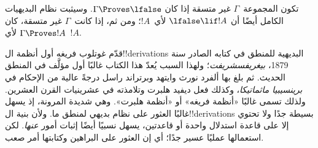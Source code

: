 \documentclass[../../../include/open-logic-section]{subfiles}
\begin{document}
تكون المجموعة~$\Gamma$ غير متسقة إذا كان $\Gamma \Proves \lfalse$.
وسيثبت نظام البديهيات الكامل أيضًا أن $\lfalse \lif !A$ لأي~$!A$؛
ومن ثم، إذا كانت~$\Gamma$ غير متسقة، كان $\Gamma \Proves !A$ لأي~$!A$.

قدّم غوتلوب فريغه أول أنظمة ال!!{derivation}s البديهية للمنطق في كتابه
الصادر سنة 1879، \emph{بيغريفسشريفت}؛ ولهذا السبب يُعدّ هذا الكتاب
غالبًا أول مؤلَّف في المنطق الحديث. ثم بلغ بها ألفرد نورث وايتهد
وبرتراند راسل درجةً عالية من الإحكام في \emph{برينسيبيا ماثماتيكا}،
وكذلك فعل ديفيد هلبرت وتلامذته في عشرينيات القرن العشرين. ولذلك تسمى
غالبًا «أنظمة فريغه» أو «أنظمة هلبرت». وهي شديدة المرونة، إذ يسهل
غالبًا العثور على نظام بديهي لمنطق ما. ولأن بنية ال!!{derivation}s
بسيطة جدًا ولا تحتوي إلا على قاعدة استدلال واحدة أو قاعدتين، يسهل
نسبيًا أيضًا إثبات أمور \emph{عنها}. لكن استعمالها عمليًا عسير جدًا؛
أي إن العثور على البراهين وكتابتها أمر صعب.
\end{document}
